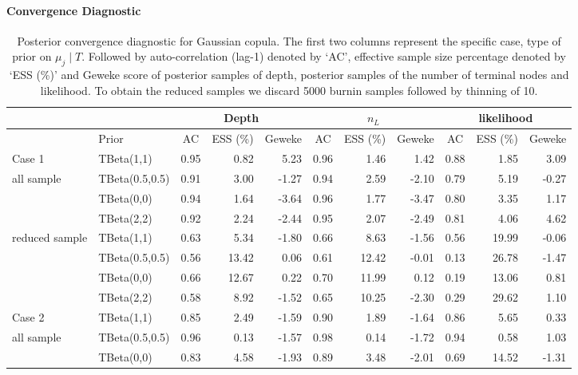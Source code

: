 \documentclass{amsart}
\begin{document}
\paragraph{Convergence Diagnostic}
\begin{table}[ht]
	\centering
	\caption{Posterior convergence diagnostic for Gaussian copula. The first two columns represent the specific case, type of prior on $\mu_j\mid T$. Followed by auto-correlation (lag-1) denoted by `AC', effective sample size percentage denoted by `ESS (\%)' and Geweke score of posterior samples of depth, posterior samples of the number of terminal nodes and likelihood. To obtain the reduced samples we discard 5000 burnin samples followed by thinning of 10.}
	\scriptsize{
		\begin{tabular}{ll|crr|crr|crr}
			\toprule
			\multicolumn{2}{c|}{} &
			\multicolumn{3}{c|}{Depth} &
			\multicolumn{3}{c|}{$n_L$} &
			\multicolumn{3}{c}{likelihood} \\
			\midrule
			& Prior & AC & ESS (\%) & Geweke & AC & ESS (\%) & Geweke & AC & ESS (\%) & Geweke \\ 
			\midrule
			Case 1 & TBeta(1,1) & 0.95 & 0.82 & 5.23 & 0.96 & 1.46 & 1.42 & 0.88 & 1.85 & 3.09 \\ 
			all sample & TBeta(0.5,0.5) & 0.91 & 3.00 & -1.27 & 0.94 & 2.59 & -2.10 & 0.79 & 5.19 & -0.27 \\ 
			& TBeta(0,0) & 0.94 & 1.64 & -3.64 & 0.96 & 1.77 & -3.47 & 0.80 & 3.35 & 1.17 \\ 
			& TBeta(2,2) & 0.92 & 2.24 & -2.44 & 0.95 & 2.07 & -2.49 & 0.81 & 4.06 & 4.62 \\ 
			\midrule
			reduced sample & TBeta(1,1) & 0.63 & 5.34 & -1.80 & 0.66 & 8.63 & -1.56 & 0.56 & 19.99 & -0.06 \\ 
			& TBeta(0.5,0.5) & 0.56 & 13.42 & 0.06 & 0.61 & 12.42 & -0.01 & 0.13 & 26.78 & -1.47 \\ 
			& TBeta(0,0) & 0.66 & 12.67 & 0.22 & 0.70 & 11.99 & 0.12 & 0.19 & 13.06 & 0.81 \\ 
			& TBeta(2,2) & 0.58 & 8.92 & -1.52 & 0.65 & 10.25 & -2.30 & 0.29 & 29.62 & 1.10 \\ 
			\midrule
			Case 2 & TBeta(1,1) & 0.85 & 2.49 & -1.59 & 0.90 & 1.89 & -1.64 & 0.86 & 5.65 & 0.33 \\ 
			all sample & TBeta(0.5,0.5) & 0.96 & 0.13 & -1.57 & 0.98 & 0.14 & -1.72 & 0.94 & 0.58 & 1.03 \\ 
			& TBeta(0,0) & 0.83 & 4.58 & -1.93 & 0.89 & 3.48 & -2.01 & 0.69 & 14.52 & -1.31 \\ 

\end{tabular}}
\end{table}
\end{document}
